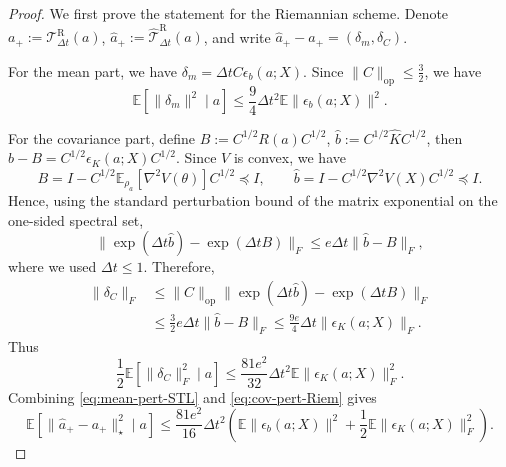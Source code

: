 \documentclass[11pt]{article}
\theoremstyle{plain}
\theoremstyle{definition}
\theoremstyle{remark}
\newcommand{\E}{\mathbb{E}}
\newcommand{\op}{\mathrm{op}}
\begin{document}
\begin{proof}
    We first prove the statement for the Riemannian scheme. Denote
        $a_+ := \mathcal{T}_{\Delta t}^{\mathrm R}(a)$,  
        $\widehat a_+ := \widehat{\mathcal{T}}_{\Delta t}^{\mathrm R}(a)$,
    and write
        $\widehat a_+ - a_+ = (\delta_m,\delta_C)$.

    For the mean part, we have
        $\delta_m = \Delta t C\epsilon_b(a;X)$.
    Since $\|C\|_\op \leq \frac{3}{2}$, we have
    \begin{equation}\label{eq:mean-pert-STL}
        \E[\|\delta_m\|^2 \mid a]
        \leq
        \frac{9}{4}\Delta t^2 \E\|\epsilon_b(a;X)\|^2.
    \end{equation}

    For the covariance part, define
        $B := C^{1/2}R(a)C^{1/2}$, 
        $\hat b := C^{1/2}\widehat K C^{1/2}$,
    then
        $\hat b-B = C^{1/2}\epsilon_K(a;X)C^{1/2}$.
    Since $V$ is convex, we have
    \begin{equation*}
        B = I - C^{1/2}\E_{\rho_a}[\nabla^2V(\theta)]C^{1/2}\preceq I,
        \qquad
        \hat b = I-C^{1/2}\nabla^2V(X)C^{1/2}\preceq I.
    \end{equation*}
    Hence, using the standard perturbation bound of the matrix exponential on the one-sided spectral set,
    \begin{equation*}
        \|\exp(\Delta t\hat b)-\exp(\Delta t B)\|_F
        \leq
        e\Delta t\|\hat b-B\|_F,
    \end{equation*}
    where we used $\Delta t\leq 1$. Therefore,
    \begin{align*}
        \|\delta_C\|_F
        &\leq
        \|C\|_\op
        \|\exp(\Delta t\hat b)-\exp(\Delta t B)\|_F  \\
        &\leq
        \frac{3}{2}e\Delta t\|\hat b-B\|_F
        \leq
        \frac{9e}{4}\Delta t\|\epsilon_K(a;X)\|_F.
    \end{align*}
    Thus
    \begin{equation}\label{eq:cov-pert-Riem}
        \frac{1}{2}\E[\|\delta_C\|_F^2\mid a]
        \leq
        \frac{81e^2}{32}\Delta t^2
        \E\|\epsilon_K(a;X)\|_F^2.
    \end{equation}
    Combining \eqref{eq:mean-pert-STL} and \eqref{eq:cov-pert-Riem} gives
    \begin{equation}\label{eq:delta-second-Riem}
        \E[\|\widehat a_+-a_+\|_\star^2\mid a]
        \leq
        \frac{81e^2}{16}\Delta t^2
        \left(
            \E\|\epsilon_b(a;X)\|^2
            +
            \frac{1}{2}\E\|\epsilon_K(a;X)\|_F^2
        \right).
    \end{equation}


\end{proof}
\end{document}
